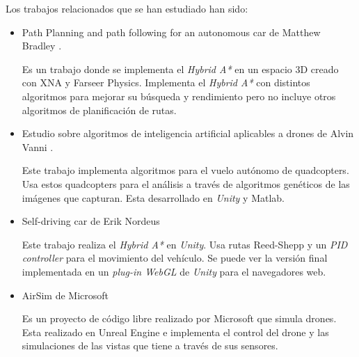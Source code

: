 

Los trabajos relacionados que se han estudiado han sido: 
\begin{itemize}
\item Path Planning and path following for an autonomous car de Matthew Bradley \cite{bradley2012path}.

Es un trabajo donde se implementa el \textit{Hybrid A*} en un espacio 3D creado con XNA y Farseer Physics. Implementa el \textit{Hybrid A*} con distintos algoritmos para mejorar su búsqueda y rendimiento pero no incluye otros algoritmos de planificación de rutas.

\item Estudio sobre algoritmos de inteligencia artificial aplicables a drones de Alvin Vanni \cite{vanni2016drones}.

Este trabajo implementa algoritmos para el vuelo autónomo de quadcopters. Usa estos quadcopters para el análisis a través de algoritmos genéticos de las imágenes que capturan. Esta desarrollado en \textit{Unity} y Matlab.

\item Self-driving car de Erik Nordeus \cite{nordeus}

Este trabajo realiza el \textit{Hybrid A*} en \textit{Unity}. Usa rutas Reed-Shepp y un \textit{PID controller} para el movimiento del vehículo. Se puede ver la versión final implementada en un \textit{plug-in WebGL} de \textit{Unity} para el navegadores web.

\item AirSim de Microsoft \cite{msairsim}

Es un proyecto de código libre realizado por Microsoft que simula drones. Esta realizado en Unreal Engine e implementa el control del drone y las simulaciones de las vistas que tiene a través de sus sensores.
\end{itemize}
